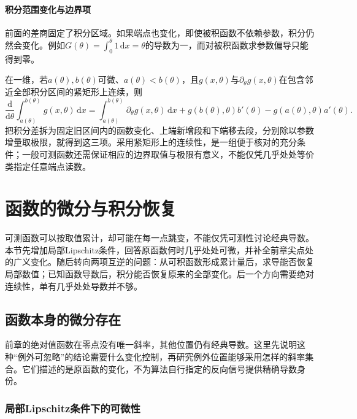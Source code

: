 \paragraph{积分范围变化与边界项}

前面的差商固定了积分区域。如果端点也变化，即使被积函数不依赖参数，积分仍然会变化。例如$G(\theta)=\int_0^\theta1\,\mathrm dx=\theta$的导数为一，而对被积函数求参数偏导只能得到零。

在一维，若$a(\theta),b(\theta)$可微、$a(\theta)<b(\theta)$，且$g(x,\theta)$与$\partial_\theta g(x,\theta)$在包含邻近全部积分区间的紧矩形上连续，则
\begin{equation}
 \frac{\mathrm d}{\mathrm d\theta}\int_{a(\theta)}^{b(\theta)}g(x,\theta)\,\mathrm dx
 =\int_{a(\theta)}^{b(\theta)}\partial_\theta g(x,\theta)\,\mathrm dx
 +g(b(\theta),\theta)b'(\theta)-g(a(\theta),\theta)a'(\theta).
\label{eq:measurable-moving-boundary-integral}
\end{equation}
把积分差拆为固定旧区间内的函数变化、上端新增段和下端移去段，分别除以参数增量取极限，就得到这三项。采用紧矩形上的连续性，是一组便于核对的充分条件；一般可测函数还需保证相应的边界取值与极限有意义，不能仅凭几乎处处等价类指定任意端点读数。

\FloatBarrier
\section{函数的微分与积分恢复}
\label{sec:measurable-differentiation-recovery}

可测函数可以按取值累计，却可能在每一点跳变，不能仅凭可测性讨论经典导数。本节先增加局部Lipschitz条件，回答原函数何时几乎处处可微，并补全前章尖点处的广义变化。随后转向两项互逆的问题：从可积函数形成累计量后，求导能否恢复局部数值；已知函数导数后，积分能否恢复原来的全部变化。后一个方向需要绝对连续性，单有几乎处处导数并不够。

\subsection{函数本身的微分存在}

前章的绝对值函数在零点没有唯一斜率，其他位置仍有经典导数。这里先说明这种“例外可忽略”的结论需要什么变化控制，再研究例外位置能够采用怎样的斜率集合。它们描述的是原函数的变化，不为算法自行指定的反向信号提供精确导数身份。

\subsubsection{局部Lipschitz条件下的可微性}
